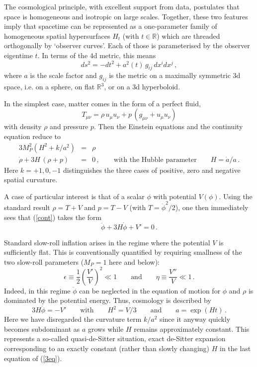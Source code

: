 \documentclass[12pt]{article}
\newcommand{\be}{\begin{equation}}
\newcommand{\ee}{\end{equation}}
\newcommand{\bea}{\begin{eqnarray}}
\newcommand{\eea}{\end{eqnarray}}
\numberwithin{equation}{section}
\begin{document}
The cosmological principle, with excellent support from data, postulates that space is homogeneous and isotropic on large scales. Together, these two features imply that spacetime can be represented as a one-parameter family of homogeneous spatial hypersurfaces $H_t$ (with $t\in\mathbb{R}$) which are threaded orthogonally by `observer curves'. Each of those is parameterised by the observer eigentime $t$. In terms of the 4d metric, this means
\be
ds^2=-dt^2+a^2(t)\,g_{ij}\,dx^i dx^j\,,
\ee
where $a$ is the scale factor and $g_{ij}$ is the metric on a maximally symmetric 3d space, i.e. on a sphere, on flat $\mathbb{R}^3$, or on a 3d hyperboloid. 

In the simplest case, matter comes in the form of a perfect fluid,
\be
T_{\mu\nu}=\rho\,u_\mu u_\nu+p\,(g_{\mu\nu}+u_\mu u_\nu)
\ee
with density $\rho$ and pressure $p$. Then the Einstein equations and the continuity equation reduce to
\bea
3 M_P^2 (H^2 + k/ a^2) &=& \rho \label{freq}
\\
\dot{\rho}+3H\,(\rho+p)&=&0\,,\qquad\mbox{with the Hubble parameter}\qquad H=\dot{a}/a\,. \label{cont}
\eea
Here $k=+1,0,-1$ distinguishes the three cases of positive, zero and negative spatial curvature.

A case of particular interest is that of a scalar $\phi$ with potential $V(\phi)$. Using the standard result $\rho=T+V$ and $p=T-V$ (with $T=\dot{\phi}^2/2$), one then immediately sees that (\ref{cont}) takes the form
\be
\ddot{\phi}+3H\dot{\phi}+V'=0\,.
\ee

Standard slow-roll inflation \cite{Starobinsky:1980te, Guth:1980zm, Sato:1980yn, Linde:1981mu, Albrecht:1982wi, Mukhanov:1981xt} arises in the regime where the potential $V$ is sufficiently flat. This is conventionally quantified by requiring smallness of the two slow-roll parameters ($M_P=1$ here and below):
\be
\epsilon\equiv\frac{1}{2}\left(\frac{V'}{V}\right)^2\ll 1\qquad\mbox{and}
\qquad \eta\equiv \frac{V''}{V}\ll 1\,.
\ee
Indeed, in this regime $\ddot{\phi}$ can be neglected in the equation of motion for $\phi$ and $\rho$ is dominated by the potential energy. Thus, cosmology is described by
\be
3H\dot{\phi}=-V'\qquad \mbox{with}\qquad H^2=V/3\qquad \mbox{and}\qquad
a=\exp(Ht)\,.\label{3eq}
\ee
Here we have disregarded the curvature term $k/a^2$ since it anyway quickly becomes subdominant as $a$ grows while $H$ remains approximately constant. This represents a so-called quasi-de-Sitter situation, exact de-Sitter expansion corresponding to an exactly constant (rather than slowly changing) $H$ in the last equation of (\ref{3eq}).
\end{document}
